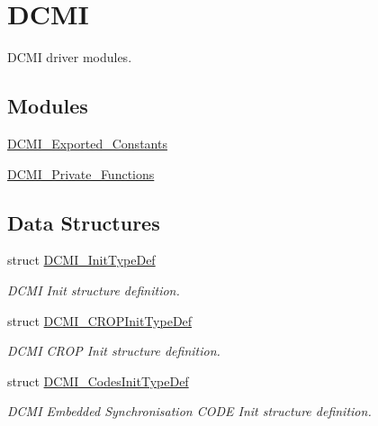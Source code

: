 \hypertarget{group___d_c_m_i}{\section{D\-C\-M\-I}
\label{group___d_c_m_i}
}


D\-C\-M\-I driver modules.  


\subsection*{Modules}
\begin{DoxyCompactItemize}
\item 
\hyperlink{group___d_c_m_i___exported___constants}{D\-C\-M\-I\-\_\-\-Exported\-\_\-\-Constants}
\item 
\hyperlink{group___d_c_m_i___private___functions}{D\-C\-M\-I\-\_\-\-Private\-\_\-\-Functions}
\end{DoxyCompactItemize}
\subsection*{Data Structures}
\begin{DoxyCompactItemize}
\item 
struct \hyperlink{struct_d_c_m_i___init_type_def}{D\-C\-M\-I\-\_\-\-Init\-Type\-Def}
\begin{DoxyCompactList}\small\item\em D\-C\-M\-I Init structure definition. \end{DoxyCompactList}\item 
struct \hyperlink{struct_d_c_m_i___c_r_o_p_init_type_def}{D\-C\-M\-I\-\_\-\-C\-R\-O\-P\-Init\-Type\-Def}
\begin{DoxyCompactList}\small\item\em D\-C\-M\-I C\-R\-O\-P Init structure definition. \end{DoxyCompactList}\item 
struct \hyperlink{struct_d_c_m_i___codes_init_type_def}{D\-C\-M\-I\-\_\-\-Codes\-Init\-Type\-Def}
\begin{DoxyCompactList}\small\item\em D\-C\-M\-I Embedded Synchronisation C\-O\-D\-E Init structure definition. \end{DoxyCompactList}\end{DoxyCompactItemize}
